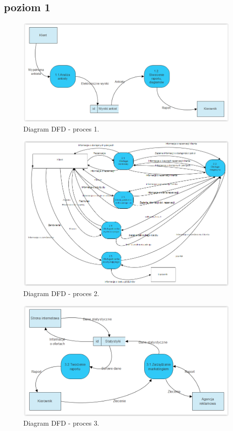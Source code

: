 \documentclass[a4paper, 11pt]{article}
\begin{document}
	
	\subsection{poziom 1}
	\indent
	\begin{figure}[H]%
			\center
			\includegraphics[scale=0.7]{Img/1.png}
			\caption{Diagram DFD - proces 1.}
	\end{figure}	
	\begin{figure}[H]%
			\center
			\includegraphics[scale=0.7]{Img/2.png}
			\caption{Diagram DFD - proces 2.}
	\end{figure}
	\begin{figure}[H]%
			\center
			\includegraphics[scale=0.7]{Img/3.png}
			\caption{Diagram DFD - proces 3.}
	\end{figure}
\end{document}
